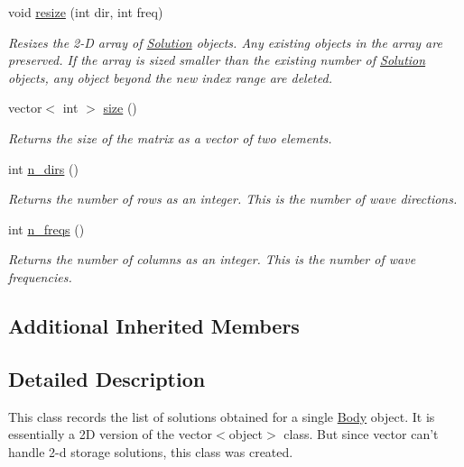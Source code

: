 \begin{DoxyCompactItemize}
void \hyperlink{class_solution_set_a1f01e0b7d5b72c8b225f15dc8d921315}{resize} (int dir, int freq)
\begin{DoxyCompactList}\small\item\em Resizes the 2-\/\-D array of \hyperlink{class_solution}{Solution} objects. Any existing objects in the array are preserved. If the array is sized smaller than the existing number of \hyperlink{class_solution}{Solution} objects, any object beyond the new index range are deleted. \end{DoxyCompactList}\item 
vector$<$ int $>$ \hyperlink{class_solution_set_a2484020f280cce582ae20f7631963adb}{size} ()
\begin{DoxyCompactList}\small\item\em Returns the size of the matrix as a vector of two elements. \end{DoxyCompactList}\item 
int \hyperlink{class_solution_set_a8cfe38b972cb389453a5251767c0defa}{n\-\_\-dirs} ()
\begin{DoxyCompactList}\small\item\em Returns the number of rows as an integer. This is the number of wave directions. \end{DoxyCompactList}\item 
int \hyperlink{class_solution_set_a03842750155f8eb60f1cc6ec46b8e85e}{n\-\_\-freqs} ()
\begin{DoxyCompactList}\small\item\em Returns the number of columns as an integer. This is the number of wave frequencies. \end{DoxyCompactList}\end{DoxyCompactItemize}
\subsection*{Additional Inherited Members}


\subsection{Detailed Description}
This class records the list of solutions obtained for a single \hyperlink{class_body}{Body} object. It is essentially a 2\-D version of the vector$<$object$>$ class. But since vector can't handle 2-\/d storage solutions, this class was created. 

